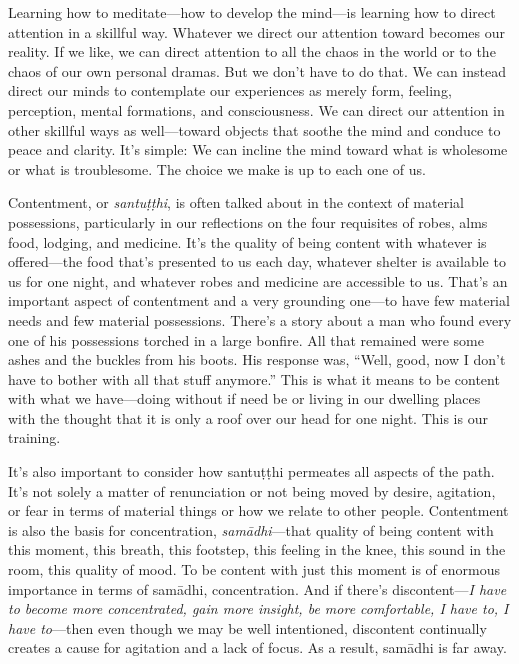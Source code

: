 
Learning how to meditate---how to develop the mind---is learning how to 
direct attention in a skillful way. Whatever we direct our attention 
toward becomes our reality. If we like, we can direct attention to all 
the chaos in the world or to the chaos of our own personal dramas. But 
we don't have to do that. We can instead direct our minds to 
contemplate our experiences as merely form, feeling, perception, mental 
formations, and consciousness. We can direct our attention in other 
skillful ways as well---toward objects that soothe the mind and conduce 
to peace and clarity. It's simple: We can incline the mind toward what 
is wholesome or what is troublesome. The choice we make is up to each 
one of us.


Contentment, or \emph{santuṭṭhi}, is often talked about in the 
context of material possessions, particularly in our reflections on the 
four requisites of robes, alms food, lodging, and medicine. It's the 
quality of being content with whatever is offered---the food that's 
presented to us each day, whatever shelter is available to us for one 
night, and whatever robes and medicine are accessible to us. That's an 
important aspect of contentment and a very grounding one---to have few 
material needs and few material possessions. There's a story about a 
man who found every one of his possessions torched in a large bonfire. 
All that remained were some ashes and the buckles from his boots. His 
response was, ``Well, good, now I don't have to bother with all that 
stuff anymore.'' This is what it means to be content with what we 
have---doing without if need be or living in our dwelling places with 
the thought that it is only a roof over our head for one night. This is 
our training.

It's also important to consider how santuṭṭhi permeates all aspects 
of the path. It's not solely a matter of renunciation or not being 
moved by desire, agitation, or fear in terms of material things or how 
we relate to other people. Contentment is also the basis for 
concentration, \emph{samādhi}---that quality of being content with 
this moment, this breath, this footstep, this feeling in the knee, this 
sound in the room, this quality of mood. To be content with just this 
moment is of enormous importance in terms of samādhi, concentration. 
And if there's discontent---\emph{I have to become more concentrated, 
gain more insight, be more comfortable, I have to, I have to}---then 
even though we may be well intentioned, discontent continually creates 
a cause for agitation and a lack of focus. As a result, samādhi is far 
away.

